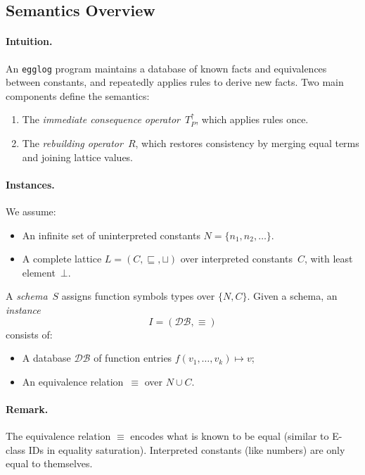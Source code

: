 \documentclass[acmsmall,screen, nonacm, anonymous]{acmart}
\newcommand{\DB}{\mathcal{DB}}               %
\begin{document}
\subsection{Semantics Overview}

\paragraph{Intuition.}
An \texttt{egglog} program maintains a database of known facts
and equivalences between constants,
and repeatedly applies rules to derive new facts.
Two main components define the semantics:

\begin{enumerate}
  \item The \emph{immediate consequence operator}~$T_P^\uparrow$,
        which applies rules once.
  \item The \emph{rebuilding operator}~$R$,
        which restores consistency by merging equal terms
        and joining lattice values.
\end{enumerate}


\paragraph{Instances.}
We assume:
\begin{itemize}
  \item An infinite set of uninterpreted constants
        $N = \{n_1, n_2, \ldots\}$.
  \item A complete lattice $L = (C, \sqsubseteq, \sqcup)$
        over interpreted constants~$C$,
        with least element~$\bot$.
\end{itemize}

A \emph{schema}~$S$ assigns function symbols types over $\{N, C\}$.
Given a schema, an \emph{instance}
\[
  I = (\DB, \equiv)
\]
consists of:
\begin{itemize}
  \item A database $\DB$ of function entries
        $f(v_1,\ldots,v_k)\mapsto v$;
  \item An equivalence relation~$\equiv$ over $N\cup C$.
\end{itemize}

\paragraph{Remark.}
The equivalence relation $\equiv$
encodes what is known to be equal
(similar to E-class IDs in equality saturation).
Interpreted constants (like numbers) are only equal to themselves.
\end{document}
